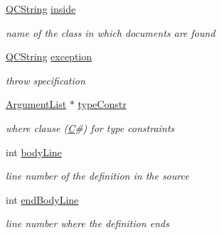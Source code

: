 \begin{DoxyCompactItemize}
\mbox{\label{class_entry_af88583a31bcd3cfc5aa52691f958833f}} 
\mbox{\hyperlink{class_q_c_string}{Q\+C\+String}} \mbox{\hyperlink{class_entry_af88583a31bcd3cfc5aa52691f958833f}{inside}}
\begin{DoxyCompactList}\small\item\em name of the class in which documents are found \end{DoxyCompactList}\item 
\mbox{\label{class_entry_a81b9c13cc15e3460c8d9fdcabeb9342d}} 
\mbox{\hyperlink{class_q_c_string}{Q\+C\+String}} \mbox{\hyperlink{class_entry_a81b9c13cc15e3460c8d9fdcabeb9342d}{exception}}
\begin{DoxyCompactList}\small\item\em throw specification \end{DoxyCompactList}\item 
\mbox{\label{class_entry_a77d30ef01feb28bf83b77d4148968f84}} 
\mbox{\hyperlink{class_argument_list}{Argument\+List}} $\ast$ \mbox{\hyperlink{class_entry_a77d30ef01feb28bf83b77d4148968f84}{type\+Constr}}
\begin{DoxyCompactList}\small\item\em where clause (\mbox{\hyperlink{class_c}{C}}\#) for type constraints \end{DoxyCompactList}\item 
\mbox{\label{class_entry_a9a2b1e3404f4723d8a6bef5966146ed0}} 
int \mbox{\hyperlink{class_entry_a9a2b1e3404f4723d8a6bef5966146ed0}{body\+Line}}
\begin{DoxyCompactList}\small\item\em line number of the definition in the source \end{DoxyCompactList}\item 
\mbox{\label{class_entry_a2db88158279ecfe391ea775f63869fc1}} 
int \mbox{\hyperlink{class_entry_a2db88158279ecfe391ea775f63869fc1}{end\+Body\+Line}}
\begin{DoxyCompactList}\small\item\em line number where the definition ends \end{DoxyCompactList}\item 
\mbox{\label{class_entry_a9f7167fc5b369f1fcd343946803efa0d}} 

\end{DoxyCompactItemize}
